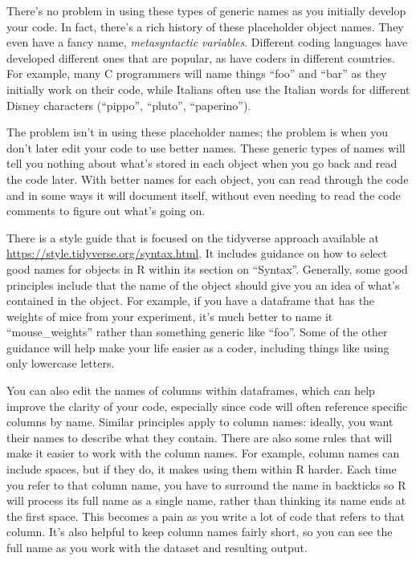 \documentclass[]{tufte-book}
\begin{document}
There's no problem in using these types of generic names as you initially
develop your code. In fact, there's a rich history of these placeholder
object names. They even have a fancy name, \emph{metasyntactic variables}.
Different coding languages have developed different ones that are popular,
as have coders in different countries. For example, many C programmers will
name things ``foo'' and ``bar'' as they initially work on their code, while
Italians often use the Italian words for different Disney characters
(``pippo'', ``pluto'', ``paperino'').

The problem isn't in using these placeholder names; the problem is when you
don't later edit your code to use better names. These generic types of names
will tell you nothing about what's stored in each object when you go back
and read the code later. With better names for each object, you can read through
the code and in some ways it will document itself, without even needing to
read the code comments to figure out what's going on.

There is a style guide that is focused on the tidyverse approach available
at \url{https://style.tidyverse.org/syntax.html}. It includes guidance on how to
select good names for objects in R within its section on ``Syntax''. Generally,
some good principles include that the name of the object should give you an
idea of what's contained in the object. For example, if you have a dataframe
that has the weights of mice from your experiment, it's much better to name
it ``mouse\_weights'' rather than something generic like ``foo''. Some of the
other guidance will help make your life easier as a coder, including things
like using only lowercase letters.

You can also edit the names of columns within dataframes, which can help improve
the clarity of your code, especially since code will often reference specific
columns by name. Similar principles apply to column names: ideally, you want
their names to describe what they contain. There are also some rules that will
make it easier to work with the column names. For example, column names can
include spaces, but if they do, it makes using them within R harder. Each time
you refer to that column name, you have to surround the name in backticks so R
will process its full name as a single name, rather than thinking its name ends
at the first space. This becomes a pain as you write a lot of code that refers
to that column. It's also helpful to keep column names fairly short, so you can
see the full name as you work with the dataset and resulting output.
\end{document}
